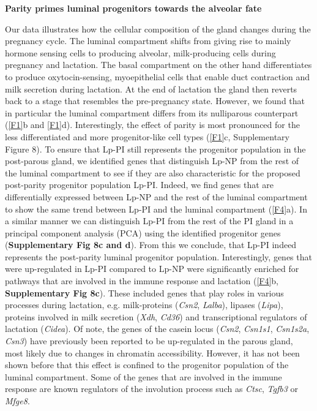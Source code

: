 \documentclass[titlepage, 12pt, oneside]{amsart}
\begin{document}
\textbf{Parity primes luminal progenitors towards the alveolar fate}

Our data illustrates how the cellular composition of the gland changes during the pregnancy cycle.
The luminal compartment shifts from giving rise to mainly hormone sensing cells to producing alveolar, milk-producing cells during pregnancy and lactation. 
The basal compartment on the other hand differentiates to produce oxytocin-sensing, myoepithelial cells that enable duct contraction and milk secretion during lactation.
At the end of lactation the gland then reverts back to a stage that resembles the pre-pregnancy state.
However, we found that in particular the luminal compartment differs from its nulliparous counterpart (\autoref{F1}b and \autoref{F1}d).
Interestingly, the effect of parity is most pronounced for the less differentiated and more progenitor-like cell types (\autoref{F1}c, Supplementary Figure 8).
To ensure that Lp-PI still represents the progenitor population in the post-parous gland, we identified genes that distinguish Lp-NP from the rest of the luminal compartment to see if they are also characteristic for the proposed post-parity progenitor population Lp-PI.
Indeed, we find genes that are differentially expressed between Lp-NP and the rest of the luminal compartment to show the same trend between Lp-PI and the luminal compartment (\autoref{F4}a).
In a similar manner we can distinguish Lp-PI from the rest of the PI gland in a principal component analysis (PCA) using the identified progenitor genes (\textbf{Supplementary Fig 8c and d}).
From this we conclude, that Lp-PI indeed represents the post-parity luminal progenitor population.
Interestingly, genes that were up-regulated in Lp-PI compared to Lp-NP were significantly enriched for pathways that are involved in the immune response and lactation (\autoref{F4}b, \textbf{Supplementary Fig 8c}).
These included genes that play roles in various processes during lactation, e.g. milk-proteins (\textit{Csn2}, \textit{Lalba}), lipases (\textit{Lipa}), proteins involved in milk secretion (\textit{Xdh}, \textit{Cd36}) and transcriptional regulators of lactation (\textit{Cidea}).
Of note, the genes of the casein locus (\textit{Csn2}, \textit{Csn1s1}, \textit{Csn1s2a}, \textit{Csn3}) have previously been reported to be up-regulated in the parous gland, most likely due to changes in chromatin accessibility\autocite{Dos2015,Rijnkels2013}.
However, it has not been shown before that this effect is confined to the progenitor population of the luminal compartment.
Some of the genes that are involved in the immune response are known regulators of the involution process such as \textit{Ctsc}, \textit{Tgfb3} or \textit{Mfge8}.
\end{document}
